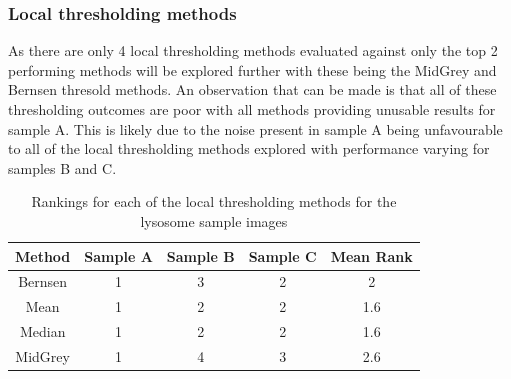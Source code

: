 \subsubsection{Local thresholding methods}
As there are only 4 local thresholding methods evaluated against only the top 2 performing methods will be explored further with these being the MidGrey and Bernsen thresold methods. An observation that can be made is that all of these thresholding outcomes are poor with all methods providing unusable results for sample A. This is likely due to the noise present in sample A being unfavourable to all of the local thresholding methods explored with performance varying for samples B and C.
\begin{table}[hb!]
	\centering
	\begin{tabular}{|c|c|c|c|c|}
		\hline
		\textbf{Method} & \textbf{Sample A} & \textbf{Sample B} & \textbf{Sample C} & \textbf{Mean Rank} \\
		\hline
		Bernsen & 1 & 3 & 2 & 2 \\
		\hline
		Mean & 1 & 2 & 2 & 1.6 \\
		\hline
		Median & 1 & 2 & 2 & 1.6 \\
		\hline
		MidGrey & 1 & 4 & 3 & 2.6 \\
		\hline
	\end{tabular}
	\caption{Rankings for each of the local thresholding methods for the lysosome sample images}
	\label{tab:lyso_local_ranks}
\end{table}
\FloatBarrier
